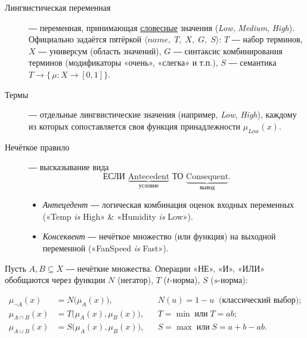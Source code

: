 \begin{description}
  \item[Лингвистическая переменная] ― переменная, принимающая
        \underline{словесные} значения
        (\textit{Low}, \textit{Medium}, \textit{High}).
        Официально задаётся пятёркой
        $\langle\!name,\;T,\;X,\;G,\;S\rangle$:
        \(
          T
        \) ― набор терминов,
        \(
          X
        \) ― универсум (область значений),
        \(
          G
        \) ― синтаксис комбинирования терминов
        (модификаторы «очень», «слегка» и т.п.),
        \(
          S
        \) ― семантика
        \(T \!\longrightarrow\! \bigl\{\,\mu\colon X\!\to\![0,1]\bigr\}\).
        \smallskip

  \item[Термы] ― отдельные лингвистические значения
        (например, \textit{Low}, \textit{High}),
        каждому из которых сопоставляется
        своя функция принадлежности $\mu_{\textit{Low}}(x)$.

  \item[Нечёткое правило] ― высказывание вида
        \[
          \textbf{ЕСЛИ }\underbrace{\text{Antecedent}}_{\text{условие}}
          \textbf{ ТО }\underbrace{\text{Consequent}}_{\text{вывод}}.
        \]
        \begin{itemize}
          \item \emph{Антецедент} ― логическая комбинация оценок
                входных переменных («Temp \textit{is} High» \& «Humidity
                \textit{is} Low»).
          \item \emph{Консеквент} ― нечёткое множество
                (или функция) на выходной переменной
                («FanSpeed \textit{is} Fast»).
        \end{itemize}
\end{description}

Пусть $A,B\subseteq X$ ― нечёткие множества.
Операции «НЕ», «И», «ИЛИ» обобщаются через функции
$N$ (негатор), $T$ ($t$-норма), $S$ ($s$-норма):

\begin{align}
  \mu_{\neg A}(x) &= N\!\bigl(\mu_A(x)\bigr), 
    && N(u)=1-u \;\;\text{(классический выбор);}   \label{eq:neg} \\[-0.5em]
  \mu_{A\cap B}(x) &= T\!\bigl(\mu_A(x),\mu_B(x)\bigr), 
    && T=\min\;\text{или}\;T=ab;                     \\[-0.5em]
  \mu_{A\cup B}(x) &= S\!\bigl(\mu_A(x),\mu_B(x)\bigr), 
    && S=\max\;\text{или}\;S=a+b-ab.                
\end{align}

